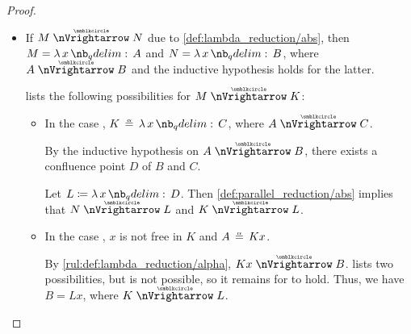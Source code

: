 \begin{proof}
\begin{itemize}
\begin{itemize}
\begin{itemize}
\begin{itemize}
          So \( L \) is the desired confluence point.

          \item In the case , \( x \) is not free in \( P \) and \( F \aequiv Px \).

          Let \( L \coloneqq PR \). Then
          and
          \begin{equation*}
            N
            =
            CD
            \ppred
            PR
            =
            L
          \end{equation*}
          and
          \begin{equation*}
            K
            \aequiv
            F[x \mapsto G]
            \reloset {\ref{thm:substitution_on_alpha_equivalent_terms}} \aequiv
            P[x \mapsto G] \thinspace G
            \reloset {\ref{thm:lambda_substitution_noop}} =
            PG
            \ppred
            PR
            =
            L.
          \end{equation*}
        \end{itemize}
      \end{itemize}
    \end{itemize}

    \item If \( M \ppred N \) due to \ref{def:lambda_reduction/abs}, then \( M = \qabs x A \) and \( N = \qabs x B \), where \( A \ppred B \) and the inductive hypothesis holds for the latter.

     lists the following possibilities for \( M \ppred K \):
    \begin{itemize}
      \item In the case , \( K \aequiv \qabs x C \), where \( A \ppred C \).

      By the inductive hypothesis on \( A \ppred B \), there exists a confluence point \( D \) of \( B \) and \( C \).

      Let \( L \coloneqq \qabs x D \). Then \ref{def:parallel_reduction/abs} implies that \( N \ppred L \) and \( K \ppred L \).

      \item In the case , \( x \) is not free in \( K \) and \( A \aequiv Kx \).

      By \ref{rul:def:lambda_reduction/alpha}, \( Kx \ppred B \).  lists two possibilities, but  is not possible, so it remains for  to hold. Thus, we have \( B = Lx \), where \( K \ppred L \).


\end{itemize}
\end{itemize}
\end{proof}
